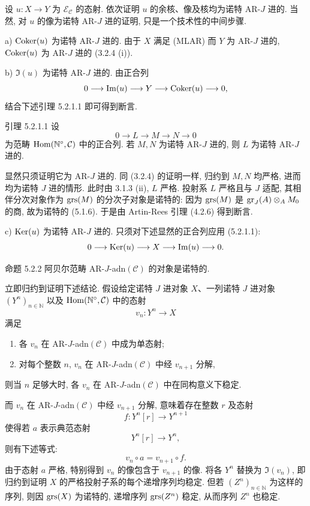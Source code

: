 \begin{prooftext}
设 \(u:X\to Y\) 为 \(\mathcal E_{\mathcal C}\) 的态射. 依次证明 \(u\) 的余核、像及核均为诺特 AR-\(J\) 进的. 当然, 对 \(u\) 的像为诺特 AR-\(J\) 进的证明, 只是一个技术性的中间步骤.

a) \(\operatorname{Coker}(u)\) 为诺特 AR-\(J\) 进的. 由于 \(X\) 满足 (MLAR) 而 \(Y\) 为 AR-\(J\) 进的, \(\operatorname{Coker}(u)\) 为 AR-\(J\) 进的 (3.2.4 (i)).

b) \(\Im(u)\) 为诺特 AR-\(J\) 进的. 由正合列
\[
0\longrightarrow \operatorname{Im}(u)\longrightarrow Y\longrightarrow \operatorname{Coker}(u)\longrightarrow 0,
\]
结合下述引理 5.2.1.1 即可得到断言.
\end{prooftext}

\begin{statement}{引理 5.2.1.1}
设
\[
0\longrightarrow L\longrightarrow M\longrightarrow N\longrightarrow0
\]
为范畴 \(\operatorname{Hom}(\mathbb N^\circ,\mathcal C)\) 中的正合列. 若 \(M,N\) 为诺特 AR-\(J\) 进的, 则 \(L\) 为诺特 AR-\(J\) 进的.
\end{statement}

\begin{prooftext}
显然只须证明它为 AR-\(J\) 进的. 同 (3.2.4) 的证明一样, 归约到 \(M,N\) 均严格, 进而均为诺特 \(J\) 进的情形. 此时由 3.1.3 (ii), \(L\) 严格. 投射系 \(L\) 严格且与 \(J\) 适配, 其相伴分次对象作为 \(\operatorname{grs}(M)\) 的分次子对象是诺特的: 因为 \(\operatorname{grs}(M)\) 是 \(\operatorname{gr}_J(A)\otimes_A M_0\) 的商, 故为诺特的 (5.1.6). 于是由 Artin-Rees 引理 (4.2.6) 得到断言.
\end{prooftext}

c) \(\operatorname{Ker}(u)\) 为诺特 AR-\(J\) 进的. 只须对下述显然的正合列应用 (5.2.1.1):
\[
0\longrightarrow \operatorname{Ker}(u)\longrightarrow X\longrightarrow \operatorname{Im}(u)\longrightarrow0.
\]

\begin{statement}{命题 5.2.2}
阿贝尔范畴 AR-\(J\)-adn\((\mathcal C)\) 的对象是诺特的.
\end{statement}

\begin{prooftext}
立即归约到证明下述结论. 假设给定诺特 \(J\) 进对象 \(X\)、一列诺特 \(J\) 进对象 \((Y^n)_{n\in\mathbb N}\) 以及 \(\operatorname{Hom}(\mathbb N^\circ,\mathcal C)\) 中的态射
\[
v_n:Y^n\longrightarrow X
\]
满足
\begin{enumerate}[label=\textup{(\roman*)}]
\item 各 \(v_n\) 在 AR-\(J\)-adn\((\mathcal C)\) 中成为单态射;
\item 对每个整数 \(n\), \(v_n\) 在 AR-\(J\)-adn\((\mathcal C)\) 中经 \(v_{n+1}\) 分解,
\end{enumerate}
则当 \(n\) 足够大时, 各 \(v_n\) 在 AR-\(J\)-adn\((\mathcal C)\) 中在同构意义下稳定.

而 \(v_n\) 在 AR-\(J\)-adn\((\mathcal C)\) 中经 \(v_{n+1}\) 分解, 意味着存在整数 \(r\) 及态射
\[
f:Y^n[r]\longrightarrow Y^{n+1}
\]
使得若 \(a\) 表示典范态射
\[
Y^n[r]\longrightarrow Y^n,
\]
则有下述等式:
\[
v_n\circ a=v_{n+1}\circ f .
\]
由于态射 \(a\) 严格, 特别得到 \(v_n\) 的像包含于 \(v_{n+1}\) 的像. 将各 \(Y^n\) 替换为 \(\Im(v_n)\), 即归约到证明 \(X\) 的严格投射子系的每个递增序列均稳定. 但若 \((Z^n)_{n\in\mathbb N}\) 为这样的序列, 则因 \(\operatorname{grs}(X)\) 为诺特的, 递增序列 \(\operatorname{grs}(Z^n)\) 稳定, 从而序列 \(Z^n\) 也稳定.
\end{prooftext}


